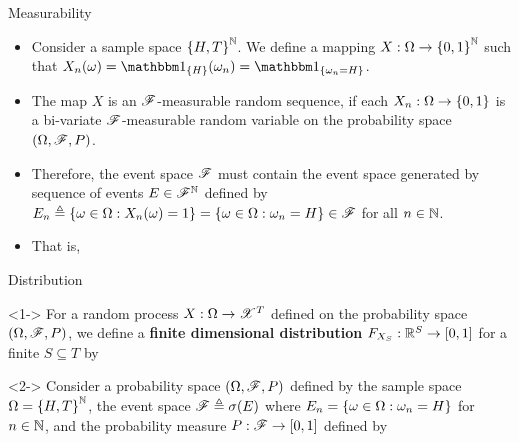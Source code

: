 \documentclass[12pt,aspectratio=169]{beamer}
\begin{document}
\begin{frame}{Measurability}
\begin{Example} 
\begin{itemize}
\item <1-> Consider a sample space $\left\{H,T\right\}^{\mathbb{N}}$. 
We define a mapping $X: \Omega \to \left\{0,1\right\}^{\mathbb{N}}$ such that $X_n(\omega) = \SetIn{H}(\omega_n) = \SetIn{\omega_n = H}$. %
\item <2-> The map $X$ is an $\mathscr{F}$-measurable random sequence, if each $X_n: \Omega \to \left\{0,1\right\}$ is a bi-variate $\mathscr{F}$-measurable random variable on the probability space $(\Omega,\mathscr{F},P)$. 
\item <3-> Therefore, the event space $\mathscr{F}$ must contain the event space generated by sequence of events $E\in\mathscr{F}^{\mathbb{N}}$ defined by $E_n \triangleq \left\{\omega \in \Omega: X_n(\omega)=1\right\} = \left\{\omega \in \Omega: \omega_n = H\right\} \in \mathscr{F}$ for all $n\in \mathbb{N}$. 
\item <4-> That is, 
\end{itemize}
\end{Example}
\end{frame}


\begin{frame}{Distribution}
\begin{Definition}<1->
For a random process $X: \Omega \to \mathscr{X}^T$ defined on the probability space $(\Omega,\mathscr{F}, P)$, 
we define a \textbf{finite dimensional distribution} $F_{X_S}: \mathbb{R}^S \to [0,1]$ for a finite $S \subseteq T$ 
by 
\end{Definition}
\begin{Example}<2->
Consider a probability space $(\Omega,\mathscr{F}, P)$ defined by the sample space $\Omega = \left\{H,T\right\}^{\mathbb{N}}$, the event space $\mathscr{F} \triangleq \sigma(E)$ where $E_n = \left\{\omega \in \Omega: \omega_n = H\right\}$ for $n\in\mathbb{N}$, 
and the probability measure $P: \mathscr{F} \to [0,1]$ defined by 
\end{Example}
\end{frame}
\end{document}

